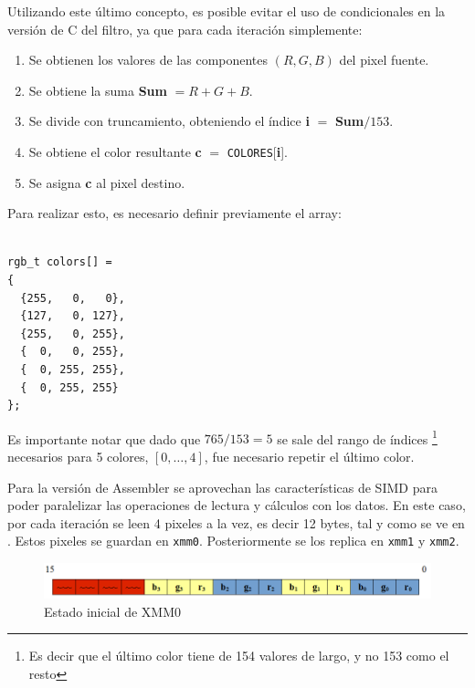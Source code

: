 Utilizando este último concepto, es posible evitar el uso de condicionales en la
versión de C del filtro, ya que para cada iteración simplemente: 

\begin{enumerate}
  \item Se obtienen los valores de las componentes $(R,G,B)$ del pixel fuente.
  \item Se obtiene la suma \textbf{Sum} $=R+G+B$.
  \item Se divide con truncamiento, obteniendo el índice \textbf{i} $=$ \textbf{Sum}$/153$.
  \item Se obtiene el color resultante \textbf{c} $=$ \texttt{COLORES}[\textbf{i}].
  \item Se asigna \textbf{c} al pixel destino.
\end{enumerate}

\newpage
Para realizar esto, es necesario definir previamente el array:
\begin{center}\begin{minipage}{10em}\begin{codesnippet}\begin{verbatim}

rgb_t colors[] =
{
  {255,   0,   0},
  {127,   0, 127},
  {255,   0, 255},
  {  0,   0, 255},
  {  0, 255, 255},
  {  0, 255, 255}
};

\end{verbatim}\end{codesnippet}\end{minipage}\end{center}  

Es importante notar que dado que $765/153=5$ se sale del rango de índices
\footnote{Es decir que el último color tiene de 154 valores de largo, y no 153
como el resto} necesarios para 5 colores, $[0,\dots,4]$, fue necesario repetir
el último color.

Para la versión de Assembler se aprovechan las características de SIMD para
poder paralelizar las operaciones de lectura y cálculos con los datos. En este
caso, por cada iteración se leen 4 pixeles a la vez, es decir 12 bytes, tal y
como se ve en . Estos pixeles se guardan en \texttt{xmm0}.
Posteriormente se los replica en \texttt{xmm1} y \texttt{xmm2}.

\begin{figure}[H]
  \begin{center}
  \includegraphics[scale=0.66]{imagenes/popart1.png}
  \caption{Estado inicial de XMM0}
  \label{fig:popart1}
  \end{center}
\end{figure}

